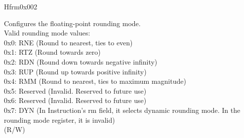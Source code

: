 \begin{register}{H}{frm}{0x002}\label{regdesc:FRM}
%
%
\regnewline%
\begin{regdesc}\begin{reglist}
\label{fielddesc:FRM}\item [FRM] Configures the floating-point rounding mode.\\
Valid rounding mode values:\\
0x0: RNE (Round to nearest, ties to even)\\
0x1: RTZ (Round towards zero)\\
0x2: RDN (Round down towards negative infinity)\\
0x3: RUP (Round up towards positive infinity)\\
0x4: RMM (Round to nearest, ties to maximum magnitude)\\
0x5: Reserved (Invalid. Reserved to future use)\\
0x6: Reserved (Invalid. Reserved to future use)\\
0x7: DYN (In Instruction's rm field, it selects dynamic rounding mode. In the rounding mode register, it is invalid)\\
(R/W)
\end{reglist}\end{regdesc}
\end{register}


